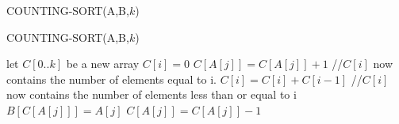 \documentclass[11pt,UTF8]{ctexart}
\begin{document}
	\begin{algorithm}
		\caption{COUNTING-SORT(A,B,$k$)}
		COUNTING-SORT(A,B,$k$)
		\begin{algorithmic}[1]
			\State let $C[0..k]$ be a new array
			\State $C[i]=0$
			\EndFor
			\State $C[A[j]]=C[A[j]]+1$
			\EndFor
			\State //$C[i]$ now contains the number of elements equal to i.
			\State $C[i]=C[i]+C[i-1]$
			\EndFor
			\State //$C[i]$ now contains the number of elements less than or equal to i
			\State $B[C[A[j]]]=A[j]$
			\State $C[A[j]]=C[A[j]]-1$
			\EndFor
		\end{algorithmic}
	\end{algorithm}
\end{document}
